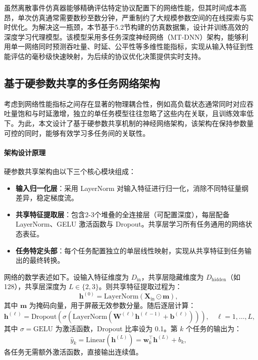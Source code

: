 虽然离散事件仿真器能够精确评估特定协议配置下的网络性能，但其时间成本高昂，单次仿真通常需要数秒至数分钟，严重制约了大规模参数空间的在线探索与实时优化。为解决这一瓶颈，本节基于5.2节构建的仿真数据集，设计并训练高效的深度学习代理模型。该模型采用多任务深度神经网络（MT-DNN）架构，能够利用单一网络同时预测吞吐量、时延、公平性等多维性能指标，实现从输入特征到性能评估的毫秒级快速映射，为后续的协议优化决策提供实时支持。

\subsection{基于硬参数共享的多任务网络架构}
\label{subsec:hard_sharing}

考虑到网络性能指标之间存在显著的物理耦合性，例如高负载状态通常同时对应吞吐量饱和与时延激增，独立的单任务模型往往忽略了这些内在关联，且训练效率低下。为此，本文设计了基于硬参数共享机制的神经网络架构，该架构在保持参数量可控的同时，能够有效学习多任务间的关联性。

\paragraph{架构设计原理}
硬参数共享架构由以下三个核心模块组成：

\begin{itemize}[leftmargin=*]
\item \textbf{输入归一化层}：采用 LayerNorm 对输入特征进行归一化，消除不同特征量纲差异，稳定梯度流。
\item \textbf{共享特征提取层}：包含2-3个堆叠的全连接层（可配置深度），每层配备 LayerNorm、GELU 激活函数与 Dropout。共享层学习所有任务通用的网络状态表征。
\item \textbf{任务特定头部}：每个任务配置独立的单层线性映射，实现从共享特征到任务输出的最终转换。
\end{itemize}

网络的数学表述如下。设输入特征维度为 $D_{\text{in}}$，共享层隐藏维度为 $D_{\text{hidden}}$（如128），共享层深度为 $L \in \{2, 3\}$。则共享特征提取过程为：
\begin{equation}
\mathbf{h}^{(0)} = \text{LayerNorm}(\mathbf{X}_{\text{in}} \odot \mathbf{m}),
\end{equation}
其中 $\mathbf{m}$ 为掩码向量，用于屏蔽无效参数分量。随后逐层计算：
\begin{equation}
\mathbf{h}^{(\ell)} = \text{Dropout}\left( \sigma\left( \text{LayerNorm}(\mathbf{W}^{(\ell)} \mathbf{h}^{(\ell-1)} + \mathbf{b}^{(\ell)}) \right) \right), \quad \ell = 1, \ldots, L,
\end{equation}
其中 $\sigma = \text{GELU}$ 为激活函数，Dropout 比率设为 0.1。第 $k$ 个任务的输出为：
\begin{equation}
\hat{y}_k = \text{Linear}(\mathbf{h}^{(L)}) = \mathbf{w}_k^{\top} \mathbf{h}^{(L)} + b_k,
\end{equation}
各任务无需额外激活函数，直接输出连续值。

